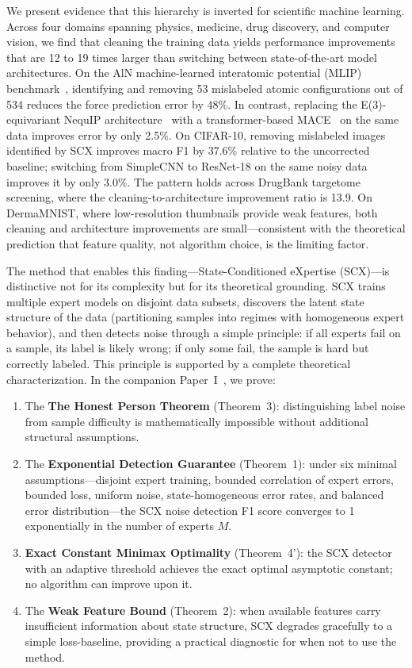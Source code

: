 \documentclass[12pt,a4paper]{article}
\begin{document}
We present evidence that this hierarchy is inverted for scientific machine learning. Across four domains spanning physics, medicine, drug discovery, and computer vision, we find that cleaning the training data yields performance improvements that are 12 to 19 times larger than switching between state-of-the-art model architectures. On the AlN machine-learned interatomic potential (MLIP) benchmark~\cite{shapeev2016moment}, identifying and removing 53 mislabeled atomic configurations out of 534 reduces the force prediction error by 48\%. In contrast, replacing the E(3)-equivariant NequIP architecture~\cite{batzner2022e3nn} with a transformer-based MACE~\cite{batatia2022mace} on the same data improves error by only 2.5\%. On CIFAR-10, removing mislabeled images identified by SCX improves macro F1 by 37.6\% relative to the uncorrected baseline; switching from SimpleCNN to ResNet-18 on the same noisy data improves it by only 3.0\%. The pattern holds across DrugBank targetome screening, where the cleaning-to-architecture improvement ratio is 13.9. On DermaMNIST, where low-resolution thumbnails provide weak features, both cleaning and architecture improvements are small---consistent with the theoretical prediction that feature quality, not algorithm choice, is the limiting factor.

The method that enables this finding---State-Conditioned eXpertise (SCX)---is distinctive not for its complexity but for its theoretical grounding. SCX trains multiple expert models on disjoint data subsets, discovers the latent state structure of the data (partitioning samples into regimes with homogeneous expert behavior), and then detects noise through a simple principle: if all experts fail on a sample, its label is likely wrong; if only some fail, the sample is hard but correctly labeled. This principle is supported by a complete theoretical characterization. In the companion Paper~I~\cite{xi2025fundamental}, we prove:

\begin{enumerate}
    \item The \textbf{The Honest Person Theorem} (Theorem~3): distinguishing label noise from sample difficulty is mathematically impossible without additional structural assumptions.
    \item The \textbf{Exponential Detection Guarantee} (Theorem~1): under six minimal assumptions---disjoint expert training, bounded correlation of expert errors, bounded loss, uniform noise, state-homogeneous error rates, and balanced error distribution---the SCX noise detection F1 score converges to 1 exponentially in the number of experts $M$.
    \item \textbf{Exact Constant Minimax Optimality} (Theorem~4'): the SCX detector with an adaptive threshold achieves the exact optimal asymptotic constant; no algorithm can improve upon it.
    \item The \textbf{Weak Feature Bound} (Theorem~2): when available features carry insufficient information about state structure, SCX degrades gracefully to a simple loss-baseline, providing a practical diagnostic for when not to use the method.
\end{enumerate}
\end{document}
